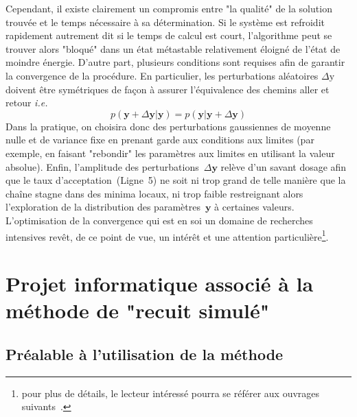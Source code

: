 \documentclass[10pt,a4paper,twoside]{report}
\begin{document}
Cependant, il existe clairement un compromis entre "la qualité" de
la solution trouvée et le temps nécessaire à sa détermination. Si le
système est refroidit rapidement autrement dit si le temps de calcul
est court, l'algorithme peut se trouver alors "bloqué" dans un état
métastable relativement éloigné de l'état de moindre énergie. D'autre
part, plusieurs conditions sont requises afin de garantir la
convergence de la procédure. En particulier, les perturbations
aléatoires $\Delta\text{y}$ doivent être symétriques de façon à
assurer l'équivalence des chemins aller et retour \emph{i.e.}
\begin{equation*}
  p(\textbf{y}+\Delta\textbf{y}|\textbf{y})=p(\textbf{y}|\textbf{y}+\Delta\textbf{y})
\end{equation*}
Dans la pratique, on choisira donc des perturbations gaussiennes de
moyenne nulle et de variance fixe en prenant garde aux conditions aux
limites (par exemple, en faisant "rebondir" les paramètres aux
limites en utilisant la valeur absolue). Enfin, l'amplitude des
perturbations~$\Delta\textbf{y}$ relève d'un savant dosage afin que le
taux d'acceptation~(Ligne~5) ne soit ni trop grand de telle manière
que la chaîne stagne dans des minima locaux, ni trop faible
restreignant alors l'exploration de la distribution des
paramètres~$\textbf{y}$ à certaines valeurs. L'optimisation de la
convergence qui est en soi un domaine de recherches intensives revêt,
de ce point de vue, un intérêt et une attention
particulière\footnote{pour plus de détails, le lecteur intéressé
  pourra se référer aux ouvrages suivants~\cite{robert,marin,gilks}.}.

\section{Projet informatique associé à la méthode de "recuit simulé"}

\subsection{Préalable à l'utilisation de la méthode}
\end{document}
